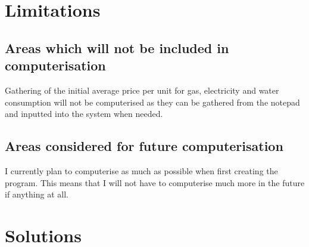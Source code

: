 \section{Limitations}

\subsection{Areas which will not be included in computerisation}
Gathering of the initial average price per unit for gas, electricity and water consumption will not be computerised as they can be gathered from the notepad and inputted into the system when needed.
\subsection{Areas considered for future computerisation}
I currently plan to computerise as much as possible when first creating the program. This means that I will not have to computerise much more in the future if anything at all.
\section{Solutions}

